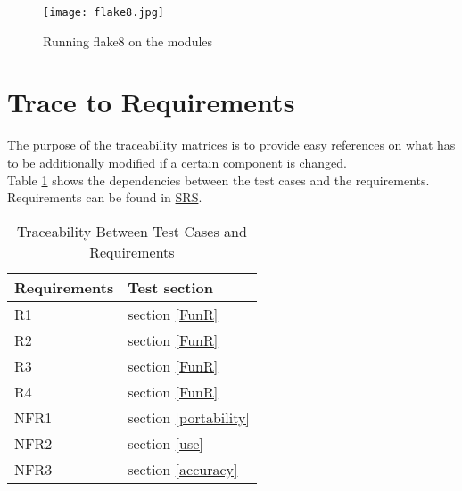 \documentclass[12pt, titlepage]{article}
\begin{document}
\begin{figure}[H]
\begin{center}
\texttt{[image: flake8.jpg]}
 \caption{Running flake8 on the modules}
 \label{flake8}
 \end{center}
 \end{figure}

\section{Trace to Requirements}
The purpose of the traceability matrices is to provide easy references on
what has to be additionally modified if a certain component is changed.\\
Table \ref{Tbltrace} shows the dependencies between the test cases and the requirements. Requirements can be found in \href{https://github.com/MinMah23/CAS741-Project/tree/main/docs/SRS}{SRS}.

\begin{table}[ht]
	\centering
	\begin{tabular}{l l} 
		\toprule		
		\textbf{Requirements} & \textbf{Test section}\\
		\midrule 
		R1 & section \ref{FunR}\\
		R2 & section \ref{FunR}\\
		R3 & section \ref{FunR}\\
		R4 & section \ref{FunR} \\
		NFR1 & section \ref{portability}\\
		NFR2 & section \ref{use}\\
		NFR3 & section \ref{accuracy}\\
		\bottomrule
	\end{tabular}\\
	
	\caption{Traceability Between Test Cases and Requirements} 
	\label{Tbltrace}
\end{table}
\end{document}
